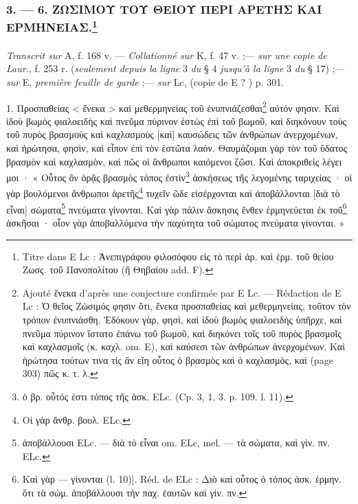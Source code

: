 \documentclass[landscape, a4paper, 11pt, oneside, polutonikogreek, french]{article}
\begin{document}
\subsubsection[3. --- 6. ΖΩΣΙΜΟΥ ΤΟΥ ΘΕΙΟΥ ΠΕΡΙ ΑΡΕΤΗΣ ΚΑΙ ΕΡΜΗΝΕΙΑΣ.]{3. --- 6. ΖΩΣΙΜΟΥ ΤΟΥ ΘΕΙΟΥ ΠΕΡΙ ΑΡΕΤΗΣ ΚΑΙ ΕΡΜΗΝΕΙΑΣ.\footnote{Titre dans E Lc : Ἀνεπιγράφου φιλοσόφου εἰς τὸ περὶ ἀρ. καὶ ἑρμ. τοῦ θείου Ζωσς. τοῦ Πανοπολίτου (ἤ Θηβαίου add. F).}}
\paragraph{}
\emph{Transcrit sur} A, f. 168 v. --- \emph{Collationné sur} K, f. 47 v. ;--- \emph{sur une copie de Laur.}, f. 253 r. (\emph{seulement depuis la ligne} 3 \emph{du} § 4 \emph{jusqu'à la ligne} 3 \emph{du} § 17) ;--- \emph{sur} E, \emph{première feuille de garde} ;--- \emph{sur} Lc, (copie de E ? ) p. 301.

\bigskip

1. Προσπαθείας < ἕνεκα > καὶ μεθερμηνείας τοῦ ἐνυπνιάζεσθαι\footnote{Ajouté ἕνεκα d'après une conjecture confirmée par E Lc. --- Rédaction de E Lc : Ὁ θεῖος Ζώσιμός φησιν ὅτι, ἕνεκα προσπαθείας καὶ μεθερμηνείας, τοῦτον τὸν τρόπον ἐνυπνιάσθη. Ἐδόκουν γὰρ, φησὶ, καὶ ἰδοὺ βωμὸς φιαλοειδὴς ὑπῆρχε, καὶ πνεῦμα πύρινον ἵστατο ἐπάνω τοῦ βωμοῦ, καὶ διηκόνει τοῖς τοῦ πυρὸς βρασμοῖς καὶ καχλασμοῖς (κ. καχλ. om. E), καὶ καύσεσι τῶν ἀνθρώπων ἀνερχομένων. Καὶ ἠρώτησα τούτων τινα τίς ἂν εἴη οὗτος ὁ βρασμὸς καὶ ὁ καχλασμὸς, καὶ (page 303) πῶς κ. τ. λ.} αὐτόν φησιν. Καὶ ἰδοὺ βωμὸς φιαλοειδὴς καὶ πνεῦμα πύρινον ἑστὼς ἐπὶ τοῦ βωμοῦ, καὶ διηκόνουν τοὺς τοῦ πυρὸς βρασμοὺς καὶ καχλασμοὺς [καὶ] καυσώδεις τῶν ἀνθρώπων ἀνερχομένων, καὶ ἠρώτησα, φησὶν, καὶ εἶπον ἐπὶ τὸν ἑστῶτα λαόν. Θαυμάζομαι γὰρ τὸν τοῦ ὕδατος βρασμὸν καὶ καχλασμὸν, καὶ πῶς οἱ ἄνθρωποι καιόμενοι ζῶσι. Καὶ ἀποκριθεὶς λέγει μοι · « Οὗτος ὃν ὁρᾷς βρασμὸς τόπος ἐστὶν\footnote{ὁ βρ. οὗτός ἐστι τόπος τῆς ἀσκ. ELc. (Cp. 3, 1, 3. p. 109. l. 11).} ἀσκήσεως τῆς λεγομένης ταριχείας · οἱ γὰρ βουλόμενοι ἄνθρωποι ἀρετῆς\footnote{Οἱ γὰρ ἄνθρ. βουλ. ELc.} τυχεῖν ῶδε εἰσέρχονται καὶ ἀποβάλλονται [διὰ τὸ εἶναι] σώματα\footnote{ἀποβάλλουσι ELc. --- διὰ τὸ εἶναι om. ELc, mel. --- τὰ σώματα, καὶ γὶν. πν. ELc.} πνεύματα γίνονται. Καὶ γὰρ πάλιν ἄσκησις ἔνθεν ἑρμηνεύεται ἐκ τοῦ\footnote{Καὶ γὰρ --- γίνονται (l. 10)]. Réd. de ELc : Διὸ καὶ οὗτος ὁ τόπος ἀσκ. ἑρμην. ὅτι τὰ σώμ. ἀποβάλλουσι τὴν παχ. ἑαυτῶν καὶ γίν. πν.} ἀσκῆσαι · οἷον γὰρ ἀποβαλλόμενα τὴν παχύτητα τοῦ σώματος πνεύματα γίνονται. »
\end{document}
